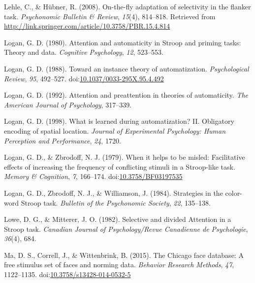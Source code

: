 \documentclass[english,,man,floatsintext]{apa6}
\begin{document}
\leavevmode\hypertarget{ref-lehle_fly_2008}{}%
Lehle, C., \& Hübner, R. (2008). On-the-fly adaptation of selectivity in the flanker task. \emph{Psychonomic Bulletin \& Review}, \emph{15}(4), 814--818. Retrieved from \url{http://link.springer.com/article/10.3758/PBR.15.4.814}

\leavevmode\hypertarget{ref-logan_attention_1980}{}%
Logan, G. D. (1980). Attention and automaticity in Stroop and priming tasks: Theory and data. \emph{Cognitive Psychology}, \emph{12}, 523--553.

\leavevmode\hypertarget{ref-logan_toward_1988}{}%
Logan, G. D. (1988). Toward an instance theory of automatization. \emph{Psychological Review}, \emph{95}, 492--527. doi:\href{https://doi.org/10.1037/0033-295X.95.4.492}{10.1037/0033-295X.95.4.492}

\leavevmode\hypertarget{ref-logan_attention_1992}{}%
Logan, G. D. (1992). Attention and preattention in theories of automaticity. \emph{The American Journal of Psychology}, 317--339.

\leavevmode\hypertarget{ref-logan_what_1998}{}%
Logan, G. D. (1998). What is learned during automatization? II. Obligatory encoding of spatial location. \emph{Journal of Experimental Psychology: Human Perception and Performance}, \emph{24}, 1720.

\leavevmode\hypertarget{ref-logan_when_1979}{}%
Logan, G. D., \& Zbrodoff, N. J. (1979). When it helps to be misled: Facilitative effects of increasing the frequency of conflicting stimuli in a Stroop-like task. \emph{Memory \& Cognition}, \emph{7}, 166--174. doi:\href{https://doi.org/10.3758/BF03197535}{10.3758/BF03197535}

\leavevmode\hypertarget{ref-logan_strategies_1984}{}%
Logan, G. D., Zbrodoff, N. J., \& Williamson, J. (1984). Strategies in the color-word Stroop task. \emph{Bulletin of the Psychonomic Society}, \emph{22}, 135--138.

\leavevmode\hypertarget{ref-lowe_selective_1982}{}%
Lowe, D. G., \& Mitterer, J. O. (1982). Selective and divided Attention in a Stroop task. \emph{Canadian Journal of Psychology/Revue Canadienne de Psychologie}, \emph{36}(4), 684.

\leavevmode\hypertarget{ref-ma_chicago_2015}{}%
Ma, D. S., Correll, J., \& Wittenbrink, B. (2015). The Chicago face database: A free stimulus set of faces and norming data. \emph{Behavior Research Methods}, \emph{47}, 1122--1135. doi:\href{https://doi.org/10.3758/s13428-014-0532-5}{10.3758/s13428-014-0532-5}
\end{document}

